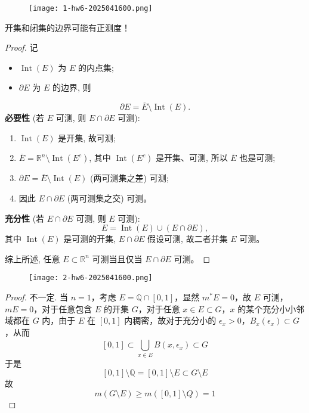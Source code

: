 \begin{exercise}
\begin{figure}[H]
\centering
\texttt{[image: 1-hw6-2025041600.png]}
\label{}
\end{figure}
\end{exercise}
\begin{note}
开集和闭集的边界可能有正测度！
\end{note}
\begin{proof}
记

\begin{itemize}
	\item $\operatorname{Int}(E)$ 为 $E$ 的内点集;
	\item $\partial E$ 为 $E$ 的边界, 则
\end{itemize}
\[
\partial E = \overline{E} \setminus \operatorname{Int}(E).
\]
\textbf{必要性} (若 $E$ 可测, 则 $E \cap \partial E$ 可测):

\begin{enumerate}
	\item $\operatorname{Int}(E)$ 是开集, 故可测;
	\item $\overline{E}=\mathbb{R}^n \setminus \operatorname{Int}\left(E^c\right)$, 其中 $\operatorname{Int}\left(E^c\right)$ 是开集、可测, 所以 $\overline{E}$ 也是可测;
	\item $\partial E=\overline{E} \setminus \operatorname{Int}(E)$ (两可测集之差) 可测;
	\item 因此 $E \cap \partial E$ (两可测集之交) 可测。
\end{enumerate}

\textbf{充分性} (若 $E \cap \partial E$ 可测, 则 $E$ 可测):
\[
E=\operatorname{Int}(E) \cup(E \cap \partial E),
\]
其中 $\operatorname{Int}(E)$ 是可测的开集, $E \cap \partial E$ 假设可测, 故二者并集 $E$ 可测。

综上所述, 任意 $E \subset \mathbb{R}^n$ 可测当且仅当 $E \cap \partial E$ 可测。
\end{proof}

\begin{exercise}
\begin{figure}[H]
\centering
\texttt{[image: 2-hw6-2025041600.png]}
\label{}
\end{figure}
\end{exercise}
\begin{proof}
不一定. 当 $n=1$，考虑 $E=\mathbb{Q}\cap[0,1]$，显然 $m^{*}E=0$，故 $E$ 可测，$mE=0$，对于任意包含 $E$ 的开集 $G$，对于任意 $x\in E\subset G$，$x$ 的某个充分小小邻域都在 $G$ 内，由于 $E$ 在 $[0,1]$ 内稠密，故对于充分小的 $\epsilon_{x}>0$，$B_{x}(\epsilon_{x})\subset G$，从而
\[
[0,1]\subset \bigcup_{x\in E}^{}B(x,\epsilon_{x})\subset G
\]
于是
\[
[0,1]\setminus \mathbb{Q}=[0,1]\setminus E\subset G\setminus E
\]
故
\[
m(G\setminus E)\geq m([0,1]\setminus Q)=1
\]
\end{proof}

